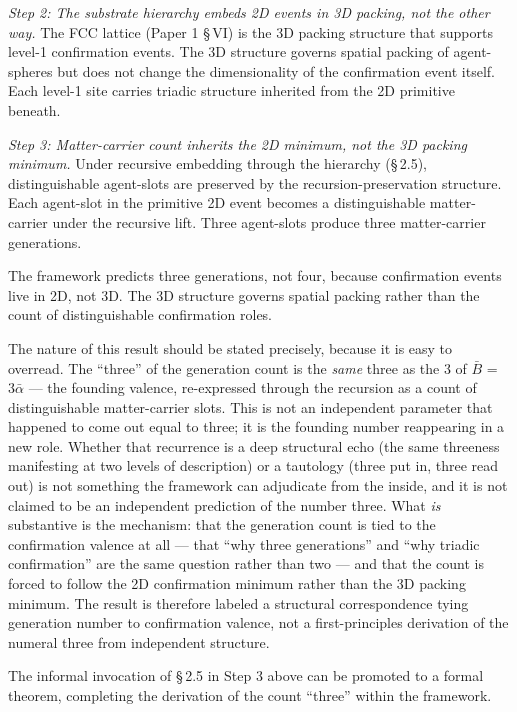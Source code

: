 \documentclass[11pt,oneside]{report}
\theoremstyle{definition}
\theoremstyle{remark}
\begin{document}
\emph{Step 2: The substrate hierarchy embeds 2D events in 3D packing,
not the other way.} The FCC lattice (Paper 1 \S\,VI) is the 3D packing
structure that supports level-1 confirmation events. The 3D structure
governs spatial packing of agent-spheres but does not change the
dimensionality of the confirmation event itself. Each level-1 site
carries triadic structure inherited from the 2D primitive beneath.

\emph{Step 3: Matter-carrier count inherits the 2D minimum, not the 3D
packing minimum.} Under recursive embedding through the hierarchy
(\S\,2.5), distinguishable agent-slots are preserved by the
recursion-preservation structure. Each agent-slot in the primitive 2D
event becomes a distinguishable matter-carrier under the recursive lift.
Three agent-slots produce three matter-carrier generations.

The framework predicts three generations, not four, because confirmation
events live in 2D, not 3D. The 3D structure governs spatial packing
rather than the count of distinguishable confirmation roles.

The nature of this result should be stated precisely, because it is easy to
overread. The ``three'' of the generation count is the \emph{same} three as the
\ensuremath{3} of \ensuremath{\bar{B}} = \ensuremath{3\bar{\alpha}} --- the founding valence, re-expressed through the
recursion as a count of distinguishable matter-carrier slots. This is not an
independent parameter that happened to come out equal to three; it is the
founding number reappearing in a new role. Whether that recurrence is a deep
structural echo (the same threeness manifesting at two levels of description) or a
tautology (three put in, three read out) is not something the framework can
adjudicate from the inside, and it is not claimed to be an independent
prediction of the number three. What \emph{is} substantive is the mechanism: that
the generation count is tied to the confirmation valence at all --- that ``why
three generations'' and ``why triadic confirmation'' are the same question rather
than two --- and that the count is forced to follow the 2D confirmation minimum
rather than the 3D packing minimum. The result is therefore labeled a structural
correspondence tying generation number to confirmation valence, not a
first-principles derivation of the numeral three from independent structure.

The informal invocation of \S\,2.5 in Step 3 above can be promoted to a
formal theorem, completing the derivation of the count ``three'' within
the framework.
\end{document}
